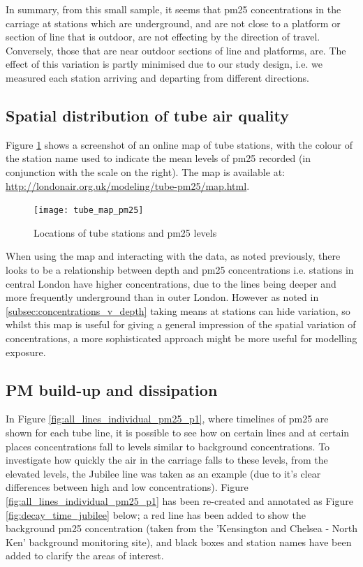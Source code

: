 In summary, from this small sample, it seems that \gls{pm25} concentrations in the carriage at stations which are underground, and are not close to a platform or section of line that is outdoor, are not effecting by the direction of travel. Conversely, those that are near outdoor sections of line and platforms, are. The effect of this variation is partly minimised due to our study design, i.e. we measured each station arriving and departing from different directions.

\subsection{Spatial distribution of tube air quality}
\label{subsec:spatial_distribution_tube_air}

Figure \ref{fig:tube_map_pm25} shows a screenshot of an online map of tube stations, with the colour of the station name used to indicate the mean levels of \gls{pm25} recorded (in conjunction with the scale on the right). The map is available at: \url{http://londonair.org.uk/modeling/tube-pm25/map.html}.

\begin{figure}[H]
\centering
\texttt{[image: tube\_map\_pm25]}
\caption{Locations of tube stations and \gls{pm25} levels}
\label{fig:tube_map_pm25}
\end{figure}

When using the map and interacting with the data, as noted previously, there looks to be a relationship between depth and \gls{pm25} concentrations i.e. stations in central London have higher concentrations, due to the lines being deeper and more frequently underground than in outer London. However as noted in \autoref{subsec:concentrations_v_depth} taking means at stations can hide variation, so whilst this map is useful for giving a general impression of the spatial variation of concentrations, a more sophisticated approach might be more useful for modelling exposure.

\subsection{PM build-up and dissipation}
\label{subsec:tube_air_build_up}
In Figure \ref{fig:all_lines_individual_pm25_p1}, where timelines of \gls{pm25} are shown for each tube line, it is possible to see how on certain lines and at certain places concentrations fall to levels similar to background concentrations. To investigate how quickly the air in the carriage falls to these levels, from the elevated levels, the Jubilee line was taken as an example (due to it's clear differences between high and low concentrations). Figure \ref{fig:all_lines_individual_pm25_p1} has been re-created and annotated as Figure \ref{fig:decay_time_jubilee} below; a red line has been added to show the background \gls{pm25} concentration (taken from the 'Kensington and Chelsea - North Ken' background monitoring site), and black boxes and station names have been added to clarify the areas of interest.

